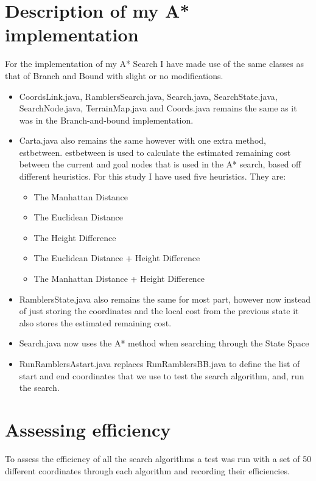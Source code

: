 \documentclass[11pt,oneside]{article}
\begin{document}
\section{Description of my A* implementation}
For the implementation of my A* Search I have made use of the same classes as that of Branch and Bound with slight or no modifications. 

\begin{itemize}
    \item CoordsLink.java, RamblersSearch.java, Search.java, SearchState.java,  SearchNode.java, TerrainMap.java and Coords.java remains the same as it was in the Branch-and-bound implementation.
    \item Carta.java also remains the same however with one extra method, estbetween. estbetween is used to calculate the estimated remaining cost between the current and goal nodes that is used in the A* search, based off different heuristics. For this study I have used five heuristics. They are:
        \begin{itemize}
            \item The Manhattan Distance
            \item The Euclidean Distance
            \item The Height Difference
            \item The Euclidean Distance + Height Difference
            \item The Manhattan Distance + Height Difference
        \end{itemize}
    
    \item RamblersState.java also remains the same for most part, however now instead of just storing the coordinates and the local cost from the previous state it also stores the estimated remaining cost.
    \item Search.java now uses the A* method when searching through the State Space
    \item RunRamblersAstart.java replaces RunRamblersBB.java to define the list of start and end coordinates that we use to test the search algorithm, and, run the search.
\end{itemize}
 
\section{Assessing efficiency}
To assess the efficiency of all the search algorithms a test was run with a set of 50 different coordinates through each algorithm and recording their efficiencies.
\end{document}
